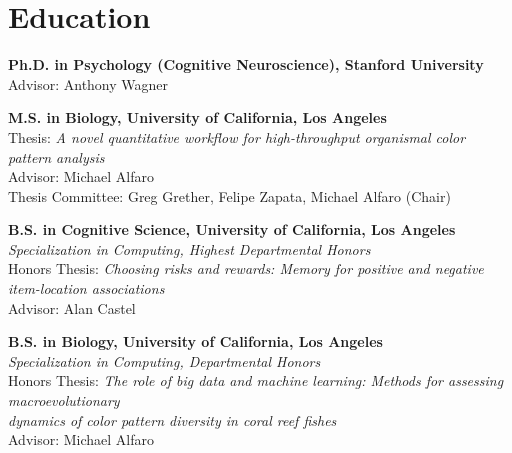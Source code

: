 \section*{Education}
\textbf{Ph.D. in Psychology (Cognitive Neuroscience), Stanford University}\\ 
Advisor: Anthony Wagner

\bigskip

\textbf{M.S. in Biology, University of California, Los Angeles}\\ 
Thesis: \textit{A novel quantitative workflow for high-throughput organismal color pattern analysis}\\
Advisor: Michael Alfaro\\
Thesis Committee: Greg Grether, Felipe Zapata, Michael Alfaro (Chair)

\bigskip

\textbf{B.S. in Cognitive Science, University of California, Los Angeles}\\ 
\textit{Specialization in Computing, Highest Departmental Honors}\\
Honors Thesis: \textit{Choosing risks and rewards: Memory for positive and negative item-location associations}\\
Advisor: Alan Castel

\medskip\medskip

\textbf{B.S. in Biology, University of California, Los Angeles}\\ 
\textit{Specialization in Computing, Departmental Honors}\\
Honors Thesis: \textit{The role of big data and machine learning: Methods for assessing macroevolutionary\\dynamics of color pattern diversity in coral reef fishes}\\
Advisor: Michael Alfaro